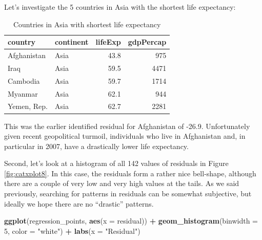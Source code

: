 \documentclass[12pt,]{krantz}
\makeatletter
\newenvironment{Shaded}{\begin{snugshade}}{\end{snugshade}}
\newcommand{\KeywordTok}[1]{\textcolor[rgb]{0.27,0.27,0.27}{\textbf{#1}}}
\newcommand{\DataTypeTok}[1]{\textcolor[rgb]{0.27,0.27,0.27}{#1}}
\newcommand{\DecValTok}[1]{\textcolor[rgb]{0.06,0.06,0.06}{#1}}
\newcommand{\StringTok}[1]{\textcolor[rgb]{0.5,0.5,0.5}{#1}}
\newcommand{\OperatorTok}[1]{\textcolor[rgb]{0.43,0.43,0.43}{\textbf{#1}}}
\newcommand{\NormalTok}[1]{#1}
\newenvironment{kframe}{%
\medskip{}
\setlength{\fboxsep}{.8em}
 \def\at@end@of@kframe{}%
 \ifinner\ifhmode%
  \def\at@end@of@kframe{\end{minipage}}%
  \begin{minipage}{\columnwidth}%
 \fi\fi%
 \def\FrameCommand##1{\hskip\@totalleftmargin \hskip-\fboxsep
 \colorbox{shadecolor}{##1}\hskip-\fboxsep
     \hskip-\linewidth \hskip-\@totalleftmargin \hskip\columnwidth}%
 \MakeFramed {\advance\hsize-\width
   \@totalleftmargin\z@ \linewidth\hsize
   \@setminipage}}%
 {\par\unskip\endMakeFramed%
 \at@end@of@kframe}
\renewenvironment{Shaded}{\begin{kframe}}{\end{kframe}}
\theoremstyle{definition}
\theoremstyle{definition}
\theoremstyle{definition}
\theoremstyle{remark}
\makeatother
\begin{document}
Let's investigate the 5 countries in Asia with the shortest life
expectancy:

\begin{Shaded}
\end{Shaded}

\begin{table}[H]

\caption{\label{tab:unnamed-chunk-205}Countries in Asia with shortest life expectancy}
\centering
\fontsize{10}{12}\selectfont
\begin{tabular}[t]{llrr}
\toprule
country & continent & lifeExp & gdpPercap\\
\midrule
Afghanistan & Asia & 43.8 & 975\\
Iraq & Asia & 59.5 & 4471\\
Cambodia & Asia & 59.7 & 1714\\
Myanmar & Asia & 62.1 & 944\\
Yemen, Rep. & Asia & 62.7 & 2281\\
\bottomrule
\end{tabular}
\end{table}

This was the earlier identified residual for Afghanistan of -26.9.
Unfortunately given recent geopolitical turmoil, individuals who live in
Afghanistan and, in particular in 2007, have a drastically lower life
expectancy.

Second, let's look at a histogram of all 142 values of residuals in
Figure \ref{fig:catxplot8}. In this case, the residuals form a rather
nice bell-shape, although there are a couple of very low and very high
values at the tails. As we said previously, searching for patterns in
residuals can be somewhat subjective, but ideally we hope there are no
``drastic'' patterns.

\begin{Shaded}
\begin{Highlighting}[]
\KeywordTok{ggplot}\NormalTok{(regression_points, }\KeywordTok{aes}\NormalTok{(}\DataTypeTok{x =}\NormalTok{ residual)) }\OperatorTok{+}
\StringTok{  }\KeywordTok{geom_histogram}\NormalTok{(}\DataTypeTok{binwidth =} \DecValTok{5}\NormalTok{, }\DataTypeTok{color =} \StringTok{"white"}\NormalTok{) }\OperatorTok{+}
\StringTok{  }\KeywordTok{labs}\NormalTok{(}\DataTypeTok{x =} \StringTok{"Residual"}\NormalTok{)}
\end{Highlighting}
\end{Shaded}
\end{document}
